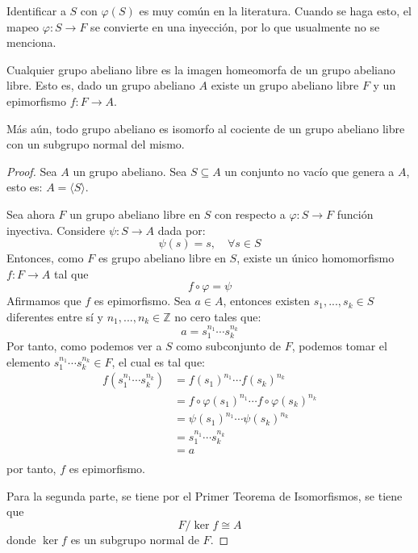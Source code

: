 \documentclass[12pt]{report}
\theoremstyle{largebreak}
\newcommand\cf[3]{\ensuremath{#1:#2\rightarrow#3}}
\begin{document}
    Identificar a $S$ con $\varphi(S)$ es muy común en la literatura. Cuando se haga esto, el mapeo $\cf{\varphi}{S}{F}$ se convierte en una inyección, por lo que usualmente no se menciona.

    \begin{propo}
        Cualquier grupo abeliano libre es la imagen homeomorfa de un grupo abeliano libre. Esto es, dado un grupo abeliano $A$ existe un grupo abeliano libre $F$ y un epimorfismo $\cf{f}{F}{A}$.
        
        Más aún, todo grupo abeliano es isomorfo al cociente de un grupo abeliano libre con un subgrupo normal del mismo.
    \end{propo}

    \begin{proof}
        Sea $A$ un grupo abeliano. Sea $S\subseteq A$ un conjunto no vacío que genera a $A$, esto es: $A=\langle S\rangle$.

        Sea ahora $F$ un grupo abeliano libre en $S$ con respecto a $\cf{\varphi}{S}{F}$ función inyectiva. Considere $\cf{\psi}{S}{A}$ dada por:
        \begin{equation*}
            \psi(s)=s,\quad\forall s\in S
        \end{equation*}
        Entonces, como $F$ es grupo abeliano libre en $S$, existe un único homomorfismo $\cf{f}{F}{A}$ tal que
        \begin{equation*}
            f\circ\varphi=\psi
        \end{equation*}
        Afirmamos que $f$ es epimorfismo. Sea $a\in A$, entonces existen $s_1,...,s_k\in S$ diferentes entre sí y $n_1,...,n_k\in\mathbb{Z}$ no cero tales que:
        \begin{equation*}
            a=s_1^{n_1}\cdots s_k^{n_k}
        \end{equation*}
        Por tanto, como podemos ver a $S$ como subconjunto de $F$, podemos tomar el elemento $s_1^{n_1}\cdots s_k^{n_k}\in F$, el cual es tal que:
        \begin{equation*}
            \begin{split}
                f\left(s_1^{n_1}\cdots s_k^{n_k}\right)&=f(s_1)^{ n_1}\cdots f(s_k)^{ n_k}\\
                &=f\circ\varphi(s_1)^{ n_1}\cdots f\circ\varphi(s_k)^{ n_k}\\
                &=\psi(s_1)^{ n_1}\cdots\psi(s_k)^{ n_k}\\
                &=s_1^{n_1}\cdots s_k^{n_k}\\
                &=a\\
            \end{split}
        \end{equation*}
        por tanto, $f$ es epimorfismo.
        
        Para la segunda parte, se tiene por el Primer Teorema de Isomorfismos, se tiene que
        \begin{equation*}
            F/\ker f\cong A
        \end{equation*}
        donde $\ker f$ es un subgrupo normal de $F$.
    \end{proof}
\end{document}
